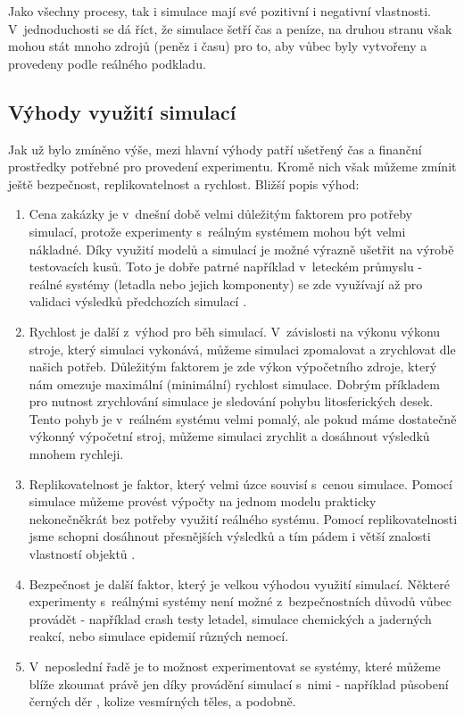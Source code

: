 Jako všechny procesy, tak i simulace mají své pozitivní i negativní vlastnosti. V~jednoduchosti se dá říct, že simulace šetří čas a peníze, na druhou stranu však mohou stát mnoho zdrojů (peněz i času) pro to, aby vůbec byly vytvořeny a provedeny podle reálného podkladu.

\subsection*{Výhody využití simulací}
\label{vyhody}
Jak už bylo zmíněno výše, mezi hlavní výhody patří  ušetřený čas a finanční prostředky potřebné pro provedení experimentu. Kromě nich však můžeme zmínit ještě bezpečnost, replikovatelnost a rychlost. Bližší popis výhod:

\begin{enumerate}
    \item Cena zakázky je v~dnešní době velmi důležitým faktorem pro potřeby simulací, protože experimenty s~reálným systémem mohou být velmi nákladné. Díky využití modelů a simulací je možné výrazně ušetřit na výrobě testovacích kusů. Toto je dobře patrné například v~leteckém průmyslu - reálné systémy (letadla nebo jejich komponenty) se zde využívají až pro validaci výsledků předchozích simulací \cite{alfaro1975simulation}.
    \item Rychlost je další z~výhod pro běh simulací. V~závislosti na výkonu výkonu stroje, který simulaci vykonává, můžeme simulaci zpomalovat a zrychlovat dle našich potřeb. Důležitým faktorem je zde výkon výpočetního zdroje, který nám omezuje maximální (minimální) rychlost simulace. Dobrým příkladem pro nutnost zrychlování simulace je sledování pohybu litosferických desek. Tento pohyb je v~reálném systému velmi pomalý, ale pokud máme dostatečně výkonný výpočetní stroj, můžeme simulaci zrychlit a dosáhnout výsledků mnohem rychleji.
    \item Replikovatelnost je faktor, který velmi úzce souvisí s~cenou simulace. Pomocí simulace můžeme provést výpočty na jednom modelu prakticky nekonečněkrát bez potřeby využití reálného systému. Pomocí replikovatelnosti jsme schopni dosáhnout přesnějších výsledků a tím pádem i větší znalosti vlastností objektů \cite{belanger2010and}.
    \item Bezpečnost je další faktor, který je velkou výhodou využití simulací. Některé experimenty s~reálnými systémy není možné z~bezpečnostních důvodů vůbec provádět - například crash testy letadel, simulace chemických a jaderných reakcí, nebo simulace epidemií různých nemocí.
    \item V~neposlední řadě je to možnost experimentovat se systémy, které můžeme blíže zkoumat právě jen díky provádění simulací s~nimi - například působení černých děr \cite{Fragile_2007}, kolize vesmírných těles, a podobně.
\end{enumerate}

